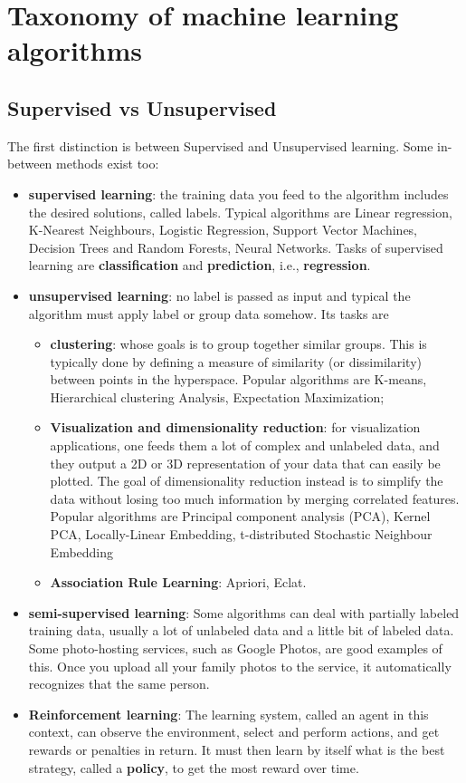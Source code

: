 \section{Taxonomy of machine learning algorithms}
\subsection{Supervised vs Unsupervised}
The first distinction is between Supervised and Unsupervised learning. Some in-between methods exist too:
\begin{itemize}
\item \textbf{supervised learning}: the training data you feed to the algorithm includes the desired solutions, called labels. Typical algorithms are Linear regression, K-Nearest Neighbours, Logistic Regression,  Support Vector Machines, Decision Trees and Random Forests, Neural Networks. Tasks of supervised learning are \textbf{classification} and \textbf{prediction}, i.e., \textbf{regression}.
\item \textbf{unsupervised learning}: no label is passed as input and typical the algorithm must apply label or group data somehow. Its tasks are 
\begin{itemize}
\item \textbf{clustering}: whose goals is to group together similar groups. This is typically done by defining a measure of similarity (or dissimilarity) between points in the hyperspace. Popular algorithms are K-means, Hierarchical clustering Analysis, Expectation Maximization; 
\item \textbf{Visualization and dimensionality reduction}: for visualization applications, one feeds them a lot of complex and unlabeled data, and they output a 2D or 3D representation of your data that can easily be plotted. The goal of dimensionality reduction instead is to simplify the data without losing too much information by merging correlated features. Popular algorithms are Principal component analysis (PCA), Kernel PCA, Locally-Linear Embedding, t-distributed Stochastic Neighbour Embedding
\item \textbf{Association Rule Learning}: Apriori, Eclat.
\end{itemize}
\item \textbf{semi-supervised learning}: Some algorithms can deal with partially labeled training data, usually a lot of unlabeled data and a little bit of labeled data. Some photo-hosting services, such as Google Photos, are good examples of this. Once you upload all your family photos to the service, it automatically recognizes that the same person.
\item \textbf{Reinforcement learning}: The learning system, called an agent in this context, can observe the environment, select and perform actions, and get rewards or penalties in return. It must then learn by itself what is the best strategy, called a \textbf{policy}, to get the most reward over time.
\end{itemize}

